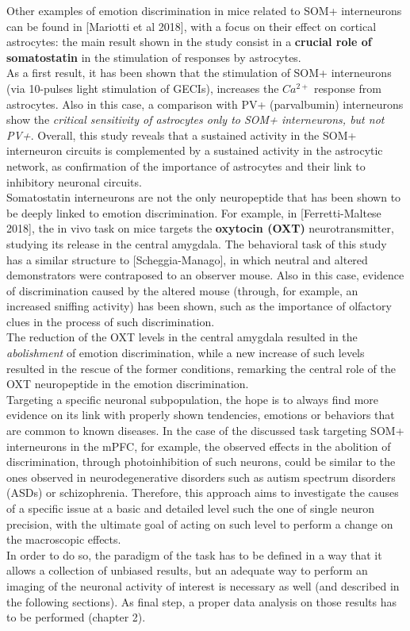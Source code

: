 \documentclass[a4paper]{article}
\begin{document}
Other examples of emotion discrimination in mice related to SOM+ interneurons can be found in [Mariotti et al 2018], with a focus on their effect on cortical astrocytes: the main result shown in the study consist in a \textbf{crucial role of somatostatin} in the stimulation of responses by astrocytes.\\
As a first result, it has been shown that the stimulation of SOM+ interneurons (via 10-pulses light stimulation of GECIs), increases the $Ca^{2+}$ response from astrocytes. Also in this case, a comparison with PV+ (parvalbumin) interneurons show the \textit{critical sensitivity of astrocytes only to SOM+ interneurons, but not PV+}. Overall, this study reveals that a sustained activity in the SOM+ interneuron circuits is complemented by
a sustained activity in the astrocytic network, as confirmation of the importance of astrocytes and their link to inhibitory neuronal circuits. 
\\

Somatostatin interneurons are not the only neuropeptide that has been shown to be deeply linked to emotion discrimination. For example, in [Ferretti-Maltese 2018], the in vivo task on mice targets the \textbf{oxytocin (OXT)} neurotransmitter, studying its release in the central amygdala. The behavioral task of this study has a similar structure to [Scheggia-Manago], in which neutral and altered demonstrators were contraposed to an observer mouse. Also in this case, evidence of  discrimination caused by the altered mouse (through, for example, an increased sniffing activity) has been shown, such as the importance of olfactory clues in the process of such discrimination.\\
The reduction of the OXT levels in the central amygdala resulted in the \textit{abolishment} of emotion discrimination, while a new increase of such levels resulted in the rescue of the former conditions, remarking the central role of the OXT neuropeptide in the emotion discrimination.
\\

Targeting a specific neuronal subpopulation, the hope is to always find  more evidence on its link with  properly shown tendencies, emotions or behaviors that are common to known diseases. In the case of the discussed task targeting SOM+ interneurons in the mPFC, for example, the observed effects in the abolition of discrimination, through photoinhibition of such neurons, could be similar to the ones observed in neurodegenerative disorders such as autism spectrum disorders (ASDs) or schizophrenia. Therefore, this approach aims to investigate the causes of a specific issue at a basic and detailed level such the one of single neuron precision, with the ultimate goal of acting on such level to perform a change on the macroscopic effects.\\
In order to do so, the paradigm of the task has to be defined in a way that it allows a collection of unbiased results, but an adequate way to perform an imaging of the neuronal activity of interest is necessary as well (and described in the following sections). As final step, a proper data analysis on those results has to be performed (chapter 2).
\end{document}

